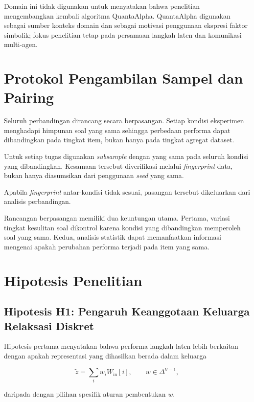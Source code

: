 Domain ini tidak digunakan untuk menyatakan bahwa penelitian mengembangkan kembali algoritma QuantaAlpha. QuantaAlpha digunakan sebagai sumber konteks domain dan sebagai motivasi penggunaan ekspresi faktor simbolik; fokus penelitian tetap pada persamaan langkah laten dan komunikasi multi-agen.

\section{Protokol Pengambilan Sampel dan Pairing}

Seluruh perbandingan dirancang secara berpasangan. Setiap kondisi eksperimen menghadapi himpunan soal yang sama sehingga perbedaan performa dapat dibandingkan pada tingkat item, bukan hanya pada tingkat agregat dataset.

Untuk setiap tugas digunakan \textit{subsample} dengan  yang sama pada seluruh kondisi yang dibandingkan. Kesamaan tersebut diverifikasi melalui \textit{fingerprint} data, bukan hanya diasumsikan dari penggunaan \textit{seed} yang sama.

Apabila \textit{fingerprint} antar-kondisi tidak sesuai, pasangan tersebut dikeluarkan dari analisis perbandingan.

Rancangan berpasangan memiliki dua keuntungan utama. Pertama, variasi tingkat kesulitan soal dikontrol karena kondisi yang dibandingkan memperoleh soal yang sama. Kedua, analisis statistik dapat memanfaatkan informasi mengenai apakah perubahan performa terjadi pada item yang sama.

\section{Hipotesis Penelitian}

\subsection{Hipotesis H1: Pengaruh Keanggotaan Keluarga Relaksasi Diskret}

Hipotesis pertama menyatakan bahwa performa langkah laten lebih berkaitan dengan apakah representasi yang dihasilkan berada dalam keluarga

\begin{equation}
\tilde z
=
\sum_iw_iW_{\mathrm{in}}[i],
\qquad
w\in\Delta^{V-1},
\end{equation}

daripada dengan pilihan spesifik aturan pembentukan \(w\).

